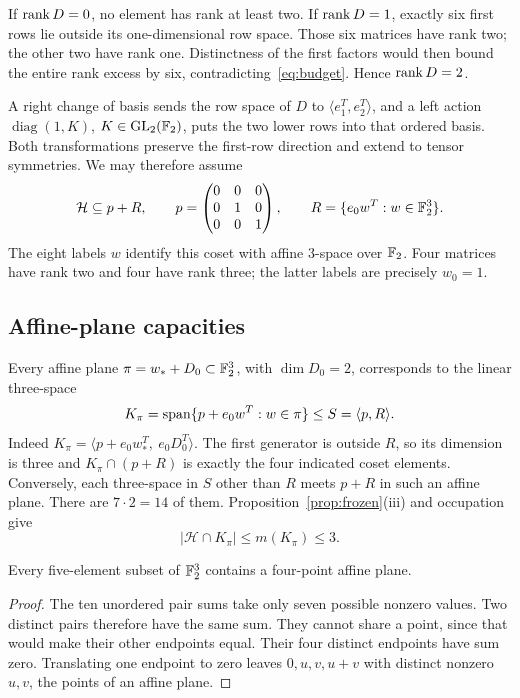 If $\operatorname{rank} D=0$, no element has rank at least two. If $\operatorname{rank} D=1$,
exactly six first rows lie outside its one-dimensional row space.
Those six matrices have rank two; the other two have rank one.
Distinctness of the first factors would then bound the entire rank
excess by six, contradicting~\eqref{eq:budget}. Hence $\operatorname{rank} D=2$.

A right change of basis sends the row space of $D$ to
$\langle e_1^T,e_2^T\rangle$, and a left action
$\operatorname{diag}(1,K)$, $K\in\operatorname{GL}_2(\mathbb F_2)$, puts the two lower
rows into that ordered basis. Both transformations preserve the
first-row direction and extend to tensor symmetries. We may therefore
assume
\begin{equation}\label{eq:normalized-coset}
 \mathcal H\subseteq p+R,\qquad
 p=\begin{pmatrix}0&0&0\\0&1&0\\0&0&1\end{pmatrix},\qquad
 R=\{e_0w^T:w\in\mathbb F_2^3\}.
\end{equation}
The eight labels $w$ identify this coset with affine $3$-space over
$\mathbb F_2$. Four matrices have rank two and four have rank three; the latter
labels are precisely $w_0=1$.

\subsection{Affine-plane capacities}
Every affine plane $\pi=w_*+D_0\subset\mathbb F_2^3$, with $\dim D_0=2$,
corresponds to the linear three-space
\[
 K_\pi=\operatorname{span}\{p+e_0w^T:w\in\pi\}\leq S=\langle p,R\rangle.
\]
Indeed $K_\pi=\langle p+e_0w_*^T,\ e_0D_0^T\rangle$.
The first generator is outside $R$, so its dimension is three and
$K_\pi\cap(p+R)$ is exactly the four indicated coset elements.
Conversely, each three-space in $S$ other than $R$ meets $p+R$ in
such an affine plane. There are $7\cdot2=14$ of them.
Proposition~\ref{prop:frozen}(iii) and occupation give
\begin{equation}\label{eq:plane-cap}
 |\mathcal H\cap K_\pi|\leq m(K_\pi)\leq3.
\end{equation}

\begin{lemma}\label{lem:five}
Every five-element subset of $\mathbb F_2^3$ contains a four-point affine plane.
\end{lemma}
\begin{proof}
The ten unordered pair sums take only seven possible nonzero values.
Two distinct pairs therefore have the same sum. They cannot share a
point, since that would make their other endpoints equal. Their four
distinct endpoints have sum zero. Translating one endpoint to zero
leaves $0,u,v,u+v$ with distinct nonzero $u,v$, the points of an
affine plane.
\end{proof}

